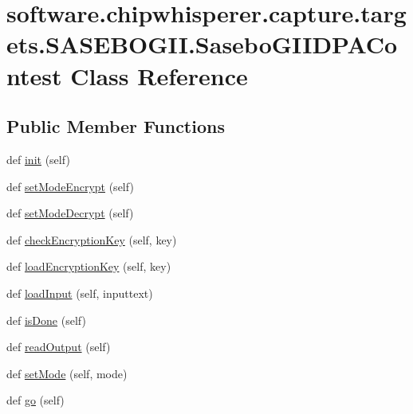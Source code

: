 \hypertarget{classsoftware_1_1chipwhisperer_1_1capture_1_1targets_1_1SASEBOGII_1_1SaseboGIIDPAContest}{}\section{software.\+chipwhisperer.\+capture.\+targets.\+S\+A\+S\+E\+B\+O\+G\+I\+I.\+Sasebo\+G\+I\+I\+D\+P\+A\+Contest Class Reference}
\label{classsoftware_1_1chipwhisperer_1_1capture_1_1targets_1_1SASEBOGII_1_1SaseboGIIDPAContest}
\subsection*{Public Member Functions}
\begin{DoxyCompactItemize}
\item 
def \hyperlink{classsoftware_1_1chipwhisperer_1_1capture_1_1targets_1_1SASEBOGII_1_1SaseboGIIDPAContest_a28895bb0d39754cad2100d63ac31341b}{init} (self)
\item 
def \hyperlink{classsoftware_1_1chipwhisperer_1_1capture_1_1targets_1_1SASEBOGII_1_1SaseboGIIDPAContest_a3d398e9dfdd13fcf99ab8ab79ac39a2f}{set\+Mode\+Encrypt} (self)
\item 
def \hyperlink{classsoftware_1_1chipwhisperer_1_1capture_1_1targets_1_1SASEBOGII_1_1SaseboGIIDPAContest_a02325d6e59b1bf1aeab3c8724584a29b}{set\+Mode\+Decrypt} (self)
\item 
def \hyperlink{classsoftware_1_1chipwhisperer_1_1capture_1_1targets_1_1SASEBOGII_1_1SaseboGIIDPAContest_aa4411a9ae3b3d71432125ea05e9c07a3}{check\+Encryption\+Key} (self, key)
\item 
def \hyperlink{classsoftware_1_1chipwhisperer_1_1capture_1_1targets_1_1SASEBOGII_1_1SaseboGIIDPAContest_a5dbf188f392980de4d621f3daa08f374}{load\+Encryption\+Key} (self, key)
\item 
def \hyperlink{classsoftware_1_1chipwhisperer_1_1capture_1_1targets_1_1SASEBOGII_1_1SaseboGIIDPAContest_a8be8a8692d23ebb986d96a933b8de79f}{load\+Input} (self, inputtext)
\item 
def \hyperlink{classsoftware_1_1chipwhisperer_1_1capture_1_1targets_1_1SASEBOGII_1_1SaseboGIIDPAContest_a5c588e351eba764f207414139f863fc1}{is\+Done} (self)
\item 
def \hyperlink{classsoftware_1_1chipwhisperer_1_1capture_1_1targets_1_1SASEBOGII_1_1SaseboGIIDPAContest_aa8b606c65fbf9e89dc4831ef972613f0}{read\+Output} (self)
\item 
def \hyperlink{classsoftware_1_1chipwhisperer_1_1capture_1_1targets_1_1SASEBOGII_1_1SaseboGIIDPAContest_a60e37b120c7485c4e26f70ed84eb405e}{set\+Mode} (self, mode)
\item 
def \hyperlink{classsoftware_1_1chipwhisperer_1_1capture_1_1targets_1_1SASEBOGII_1_1SaseboGIIDPAContest_a3ceca6e6d77ec7f0642a02c85c67c1f9}{go} (self)
\end{DoxyCompactItemize}


